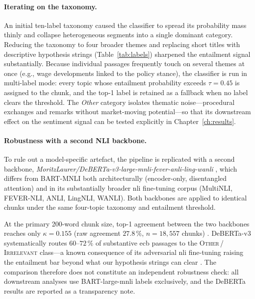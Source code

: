 \paragraph{Iterating on the taxonomy.} An initial ten-label taxonomy caused the classifier to spread its probability mass thinly and collapse heterogeneous segments into a single dominant category. Reducing the taxonomy to four broader themes and replacing short titles with descriptive hypothesis strings (Table~\ref{tab:labels}) sharpened the entailment signal substantially. Because individual passages frequently touch on several themes at once (e.g., wage developments linked to the policy stance), the classifier is run in multi-label mode: every topic whose entailment probability exceeds $\tau = 0.45$ is assigned to the chunk, and the top-1 label is retained as a fallback when no label clears the threshold. The \emph{Other} category isolates thematic noise---procedural exchanges and remarks without market-moving potential---so that its downstream effect on the sentiment signal can be tested explicitly in Chapter~\ref{ch:results}.

\paragraph{Robustness with a second NLI backbone.} To rule out a model-specific artefact, the pipeline is replicated with a second backbone, \emph{MoritzLaurer/DeBERTa-v3-large-mnli-fever-anli-ling-wanli} \cite{laurer2024deberta}, which differs from BART-MNLI both architecturally (encoder-only, disentangled attention) and in its substantially broader \gls{nli} fine-tuning corpus (MultiNLI, FEVER-NLI, ANLI, LingNLI, WANLI). Both backbones are applied to identical chunks under the same four-topic taxonomy and entailment threshold.

At the primary 200-word chunk size, top-1 agreement between the two backbones reaches only $\kappa = 0.155$ (raw agreement $27.8\,\%$, $n = 18{,}557$ chunks) \cite{landis1977measurement}. DeBERTa-v3 systematically routes $60$--$72\,\%$ of substantive \gls{ecb} passages to the \textsc{Other\,/\,Irrelevant} class---a known consequence of its adversarial \gls{nli} fine-tuning raising the entailment bar beyond what our hypothesis strings can clear \cite{laurer2024deberta}. The comparison therefore does not constitute an independent robustness check: all downstream analyses use BART-large-mnli labels exclusively, and the DeBERTa results are reported as a transparency note.

